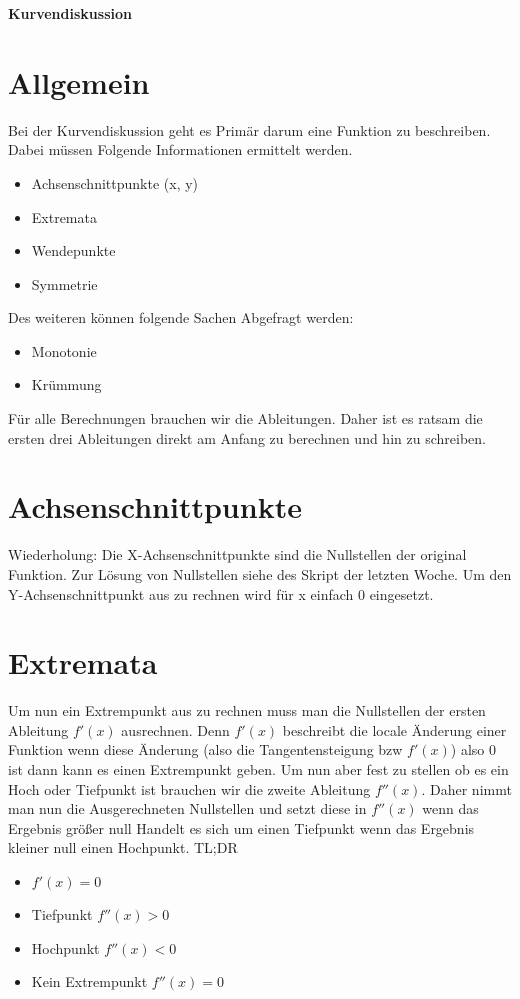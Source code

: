 \documentclass[11pt,a4paper]{article}
\begin{document}
\begin{center}
\huge \textbf{Kurvendiskussion}
\end{center}

\section{Allgemein}

Bei der Kurvendiskussion geht es Primär darum eine Funktion zu beschreiben. Dabei müssen Folgende Informationen ermittelt werden.

\begin{itemize}
\item Achsenschnittpunkte (x, y)
\item Extremata
\item Wendepunkte
\item Symmetrie
\end{itemize}

Des weiteren können folgende Sachen Abgefragt werden:

\begin{itemize}
\item Monotonie
\item Krümmung
\end{itemize}

Für alle Berechnungen brauchen wir die Ableitungen. Daher ist es ratsam die ersten drei Ableitungen direkt am Anfang zu berechnen und hin zu schreiben.

\section{Achsenschnittpunkte}

Wiederholung: Die X-Achsenschnittpunkte sind die Nullstellen der original Funktion. Zur Lösung von Nullstellen siehe des Skript der letzten Woche. Um den Y-Achsenschnittpunkt aus zu rechnen wird für x einfach 0 eingesetzt.

\newpage

\section{Extremata}

Um nun ein Extrempunkt aus zu rechnen muss man die Nullstellen der ersten Ableitung $f'(x)$ ausrechnen. Denn $f'(x)$ beschreibt die locale Änderung einer Funktion wenn diese Änderung (also die Tangentensteigung bzw $f'(x)$) also 0 ist dann kann es einen Extrempunkt geben. Um nun aber fest zu stellen ob es ein Hoch oder Tiefpunkt ist brauchen wir die zweite Ableitung $f''(x)$. Daher nimmt man nun die Ausgerechneten Nullstellen und setzt diese in $f''(x)$ wenn das Ergebnis größer null Handelt es sich um einen Tiefpunkt wenn das Ergebnis kleiner null einen Hochpunkt.
\newline
\newline
TL;DR
\begin{itemize}
\item $f'(x) = 0$
\item Tiefpunkt $f''(x) > 0$
\item Hochpunkt $f''(x) < 0$
\item Kein Extrempunkt $f''(x) = 0$
\end{itemize}
\end{document}
